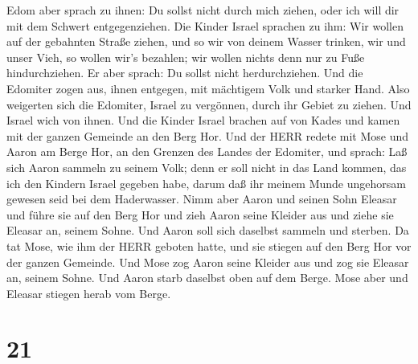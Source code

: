  Edom aber sprach zu ihnen: Du sollst nicht durch mich
ziehen, oder ich will dir mit dem Schwert entgegenziehen. 
Die Kinder Israel sprachen zu ihm: Wir wollen auf der gebahnten Straße
ziehen, und so wir von deinem Wasser trinken, wir und unser Vieh, so
wollen wir's bezahlen; wir wollen nichts denn nur zu Fuße
hindurchziehen.  Er aber sprach: Du sollst nicht
herdurchziehen. Und die Edomiter zogen aus, ihnen entgegen, mit
mächtigem Volk und starker Hand.  Also weigerten sich die
Edomiter, Israel zu vergönnen, durch ihr Gebiet zu ziehen. Und Israel
wich von ihnen.  Und die Kinder Israel brachen auf von
Kades und kamen mit der ganzen Gemeinde an den Berg Hor. 
Und der HERR redete mit Mose und Aaron am Berge Hor, an den Grenzen des
Landes der Edomiter, und sprach:  Laß sich Aaron sammeln zu
seinem Volk; denn er soll nicht in das Land kommen, das ich den Kindern
Israel gegeben habe, darum daß ihr meinem Munde ungehorsam gewesen seid
bei dem Haderwasser.  Nimm aber Aaron und seinen Sohn
Eleasar und führe sie auf den Berg Hor  und zieh Aaron
seine Kleider aus und ziehe sie Eleasar an, seinem Sohne. Und Aaron soll
sich daselbst sammeln und sterben.  Da tat Mose, wie ihm
der HERR geboten hatte, und sie stiegen auf den Berg Hor vor der ganzen
Gemeinde.  Und Mose zog Aaron seine Kleider aus und zog sie
Eleasar an, seinem Sohne.  Und Aaron starb daselbst oben
auf dem Berge. Mose aber und Eleasar stiegen herab vom Berge.

\hypertarget{section-20}{%
\section{21}\label{section-20}}

